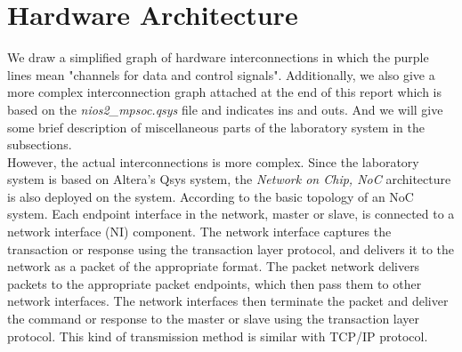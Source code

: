 \documentclass[conference]{IEEEtran}
\begin{document}
\section{Hardware Architecture}
We draw a simplified graph of hardware interconnections in which the purple lines mean "channels for data and control signals". Additionally, we also give a more complex interconnection graph attached at the end of this report which is based on the \emph{nios2\_mpsoc.qsys} file and indicates ins and outs. And we will give some brief description of miscellaneous parts of the laboratory system in the subsections.\\
\indent
However, the actual interconnections is more complex. Since the laboratory system is based on Altera's Qsys system, the \emph{Network on Chip, NoC} architecture is also deployed on the system. According to the basic topology of an NoC system. Each endpoint interface in the network, master or slave, is connected to a network interface (NI) component. The network interface captures the transaction or response using the transaction layer protocol, and delivers it to the network as a packet of the appropriate format. The packet network delivers packets to the appropriate packet endpoints, which then pass them to other network interfaces. The network interfaces then terminate the packet and deliver the command or response to the master or slave using the transaction  layer protocol\cite{NoC}. This kind of transmission method is similar with TCP/IP protocol.
\end{document}
